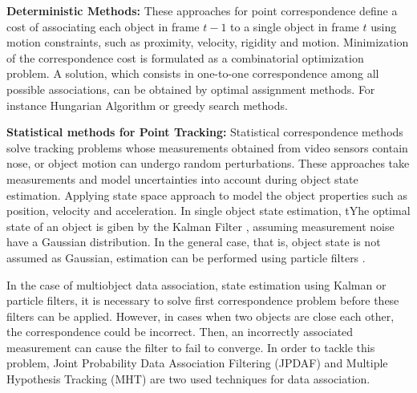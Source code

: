 \textbf{Deterministic Methods: } These approaches for point correspondence define a cost of associating each object in frame $t-1$ to a single object in frame $t$ using motion constraints, such as proximity, velocity, rigidity and motion. Minimization of the correspondence cost is formulated as a combinatorial optimization problem. A solution, which consists in one-to-one correspondence among all possible associations, can be obtained by optimal assignment methods. For instance Hungarian Algorithm \cite{Qin2012} or greedy search methods.

\textbf{Statistical methods for Point Tracking: } Statistical correspondence methods solve tracking problems whose measurements obtained from video sensors contain nose, or object motion can undergo random perturbations. These approaches take measurements and model uncertainties into account during object state estimation. Applying state space approach to model the object properties such as position, velocity and acceleration. In single object state estimation, tYhe optimal state of an object is giben by the Kalman Filter \cite{Ren2008a,Heikkila2004}, assuming measurement noise have a Gaussian distribution. In the general case, that is, object state is not assumed as Gaussian, estimation can be performed using particle filters \cite{Okuma2004,Rittscher2000}.

In the case of multiobject data association, state estimation using Kalman or particle filters, it is necessary to solve first correspondence problem before these filters can be applied. However, in cases when two objects are close each other, the correspondence could be incorrect. Then, an incorrectly associated measurement can cause the filter to fail to converge. In order to tackle this problem, Joint Probability Data Association Filtering (JPDAF) \cite{Schulz2003} and Multiple Hypothesis Tracking (MHT) \cite{Zulkifley2012} are two used techniques for data association.

